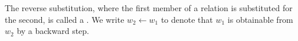 The reverse substitution, where the first member of a relation is substituted for the second, is called a . We write $w_2 \leftarrow w_1$ to denote that $w_1$ is obtainable from $w_2$ by a backward step.
